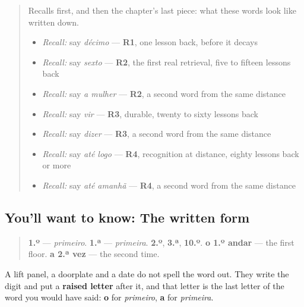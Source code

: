 \label{lesson:PT-C28-indicador}



\begin{quote}
Recalls first, and then the chapter's last piece: what these words look like written down.

\begin{itemize}
\raggedright
  \item \emph{Recall:} say \emph{décimo} — \textbf{R1}, one lesson back, before it decays
  \item \emph{Recall:} say \emph{sexto} — \textbf{R2}, the first real retrieval, five to fifteen lessons back
  \item \emph{Recall:} say \emph{a mulher} — \textbf{R2}, a second word from the same distance
  \item \emph{Recall:} say \emph{vir} — \textbf{R3}, durable, twenty to sixty lessons back
  \item \emph{Recall:} say \emph{dizer} — \textbf{R3}, a second word from the same distance
  \item \emph{Recall:} say \emph{até logo} — \textbf{R4}, recognition at distance, eighty lessons back or more
  \item \emph{Recall:} say \emph{até amanhã} — \textbf{R4}, a second word from the same distance
\end{itemize}
\end{quote}

\subsection*{You'll want to know: The written form}
\begin{quote}
\textbf{1.º} — \emph{primeiro}. \textbf{1.ª} — \emph{primeira}. \textbf{2.º}, \textbf{3.ª}, \textbf{10.º}. \textbf{o 1.º andar} — the first floor. \textbf{a 2.ª vez} — the second time.
\end{quote}

A lift panel, a doorplate and a date do not spell the word out. They write the digit and put a \textbf{raised letter} after it, and that letter is the last letter of the word you would have said: \textbf{o} for \emph{primeiro}, \textbf{a} for \emph{primeira}.

